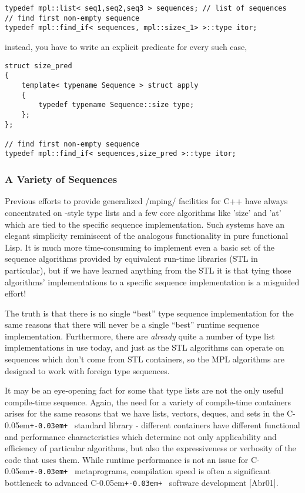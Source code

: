 \documentclass{kapproc}
\newcommand{\Cpp}{C\kern-0.05em\texttt{+\kern-0.03em+}%
}
\begin{document}
\begin{enumerate}
{\small
\begin{codesamp}\begin{verbatim}
typedef mpl::list< seq1,seq2,seq3 > sequences; // list of sequences
// find first non-empty sequence
typedef mpl::find_if< sequences, mpl::size<_1> >::type itor;
\end{verbatim}
\end{codesamp}
}

instead, you have to write an explicit predicate for every such case, 

{\small
\begin{codesamp}\begin{verbatim}
struct size_pred
{
    template< typename Sequence > struct apply
    {
        typedef typename Sequence::size type;
    };
};

// find first non-empty sequence
typedef mpl::find_if< sequences,size_pred >::type itor;
\end{verbatim}
\end{codesamp}
}

\end{enumerate}

 
  \subsubsection{A Variety of Sequences}

Previous efforts to provide generalized /mping/ facilities for C++
have always concentrated on -style type lists and a few
core algorithms like 'size' and 'at' which are tied to the specific
sequence implementation. Such systems have an elegant simplicity
reminiscent of the analogous functionality in pure functional Lisp. It
is much more time-consuming to implement even a basic set of the
sequence algorithms provided by equivalent run-time libraries (STL in
particular), but if we have learned anything from the STL it is that
tying those algorithms' implementations to a specific sequence
implementation is a misguided effort!

The truth is that there is no single ``best'' type sequence
implementation for the same reasons that there will never be a single
``best'' runtime sequence implementation. Furthermore, there are
\emph{already} quite a number of type list implementations in use
today, and just as the STL algorithms can operate on sequences which
don't come from STL containers, so the MPL algorithms are designed to
work with foreign type sequences.

It may be an eye-opening fact for some that type lists are not the
only useful compile-time sequence. Again, the need for a variety of
compile-time containers arises for the same reasons that we have
lists, vectors, deques, and sets in the \Cpp\ standard library -
different containers have different functional and performance
characteristics which determine not only applicability and efficiency
of particular algorithms, but also the expressiveness or verbosity of
the code that uses them. While runtime performance is not an issue for
\Cpp\ metaprograms, compilation speed is often a significant
bottleneck to advanced \Cpp\ software development [Abr01].
\end{document}
